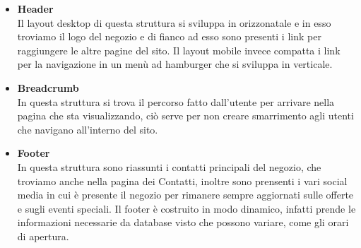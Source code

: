 	\begin{itemize}
		\item \textbf{Header}\\Il layout desktop di questa struttura si sviluppa in orizzonatale e in esso troviamo il logo del negozio e di fianco ad esso sono presenti i link per raggiungere le altre pagine del sito. Il layout mobile invece compatta i link per la navigazione in un menù ad hamburger che si sviluppa in verticale.
		\item \textbf{Breadcrumb}\\In questa struttura si trova il percorso fatto dall'utente per arrivare nella pagina che sta visualizzando, ciò serve per non creare smarrimento agli utenti che navigano all'interno del sito.
		\item \textbf{Footer}\\In questa struttura sono riassunti i contatti principali del negozio, che troviamo anche nella pagina dei Contatti, inoltre sono prensenti i vari social media in cui è presente il negozio per rimanere sempre aggiornati sulle offerte e sugli eventi speciali. Il footer è costruito in modo dinamico, infatti prende le informazioni necessarie da database visto che possono variare, come gli orari di apertura.
 	\end{itemize}
 		
